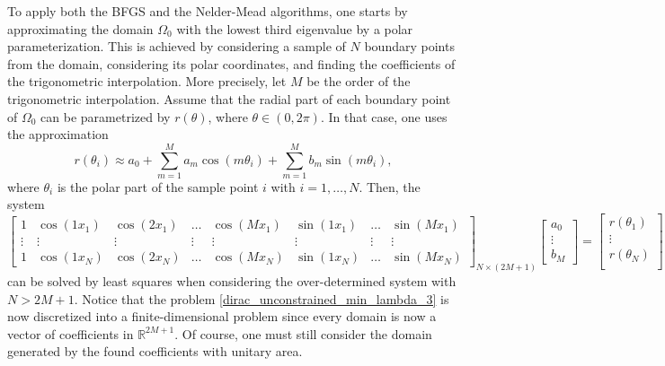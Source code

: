 To apply both the \ac{BFGS} and the Nelder-Mead algorithms, one starts by approximating the domain \(\Omega_0\) with the lowest third eigenvalue by a polar parameterization. This is achieved by considering a sample of \(N\) boundary points from the domain, considering its polar coordinates, and finding the coefficients of the trigonometric interpolation. More precisely, let \(M\) be the order of the trigonometric interpolation. Assume that the radial part of each boundary point of \(\Omega_0\) can be parametrized by \(r(\theta)\), where \(\theta \in (0, 2\pi)\). In that case, one uses the approximation
\[
    r(\theta_i) \approx a_0 + \sum_{m=1}^{M}a_m \cos(m \theta_i) + \sum_{m=1}^{M}b_m \sin(m \theta_i),
\]
where \(\theta_i\) is the polar part of the sample point \(i\) with \(i=1,\dots,N\). Then, the system
\[
    \begin{bmatrix}
        1 & \cos(1 x_1) & \cos(2 x_1) & \dots & \cos(M x_1) & \sin(1 x_1) & \dots & \sin(M x_1)\\
        \vdots & \vdots & \vdots & \vdots & \vdots & \vdots & \vdots & \vdots\\
        1 & \cos(1 x_N) & \cos(2 x_N) & \dots & \cos(M x_N) & \sin(1 x_N) & \dots & \sin(M x_N)
    \end{bmatrix}_{N\times(2M+1)}
    \begin{bmatrix}
        a_0\\
        \vdots\\
        b_M
    \end{bmatrix}
    =
    \begin{bmatrix}
        r(\theta_1)\\
        \vdots\\
        r(\theta_N)\\
    \end{bmatrix}
\]
can be solved by least squares when considering the over-determined system with \(N > 2M+1\). Notice that the problem \eqref{dirac_unconstrained_min_lambda_3} is now discretized into a finite-dimensional problem since every domain is now a vector of coefficients in \(\mathbb{R}^{2M+1}\). Of course, one must still consider the domain generated by the found coefficients with unitary area.

